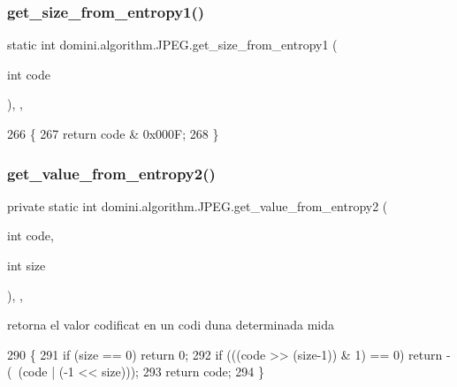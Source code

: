 \subsubsection{\texorpdfstring{get\+\_\+size\+\_\+from\+\_\+entropy1()}{get\_size\_from\_entropy1()}}
{\footnotesize\ttfamily static int domini.\+algorithm.\+J\+P\+E\+G.\+get\+\_\+size\+\_\+from\+\_\+entropy1 (\begin{DoxyParamCaption}\item[{int}]{code }\end{DoxyParamCaption})\hspace{0.3cm}{\ttfamily [inline]}, {\ttfamily [static]}, {\ttfamily [private]}}


\begin{DoxyCode}
266                                                         \{
267         \textcolor{keywordflow}{return} code & 0x000F;
268     \}
\end{DoxyCode}
\mbox{\label{classdomini_1_1algorithm_1_1JPEG_a41c69fe2e29999dd17a555859df22530}} 
\subsubsection{\texorpdfstring{get\+\_\+value\+\_\+from\+\_\+entropy2()}{get\_value\_from\_entropy2()}}
{\footnotesize\ttfamily private static int domini.\+algorithm.\+J\+P\+E\+G.\+get\+\_\+value\+\_\+from\+\_\+entropy2 (\begin{DoxyParamCaption}\item[{int}]{code,  }\item[{int}]{size }\end{DoxyParamCaption})\hspace{0.3cm}{\ttfamily [inline]}, {\ttfamily [static]}, {\ttfamily [private]}}



retorna el valor codificat en un codi d\textquotesingle{}una determinada mida 


\begin{DoxyCode}
290                                                                    \{
291         \textcolor{keywordflow}{if} (size == 0) \textcolor{keywordflow}{return} 0;
292         \textcolor{keywordflow}{if} (((code >> (size-1)) & 1) == 0) \textcolor{keywordflow}{return} -(~(code | (-1 << size)));
293         \textcolor{keywordflow}{return} code;
294     \}
\end{DoxyCode}
\mbox{\label{classdomini_1_1algorithm_1_1JPEG_a3a6e16b0ee34746e4b0118ed9107bd75}} 
